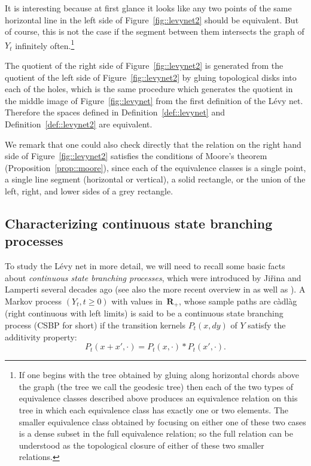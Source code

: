 \documentclass[JEP,XML,SOM,Unicode]{cedram}
\theoremstyle{plain}
\numberwithin{theorem}{section}
\theoremstyle{definition}
\newcommand{\R}{\mathbf{R}}
\newcommand{\cadlag}{càdlàg}
\begin{document}
\smallskip
It is interesting because at first glance it looks like any two points of the same horizontal line in the left side of Figure~\ref{fig::levynet2} should be equivalent. But of course, this is not the case if the segment between them intersects the graph of $Y_t$ infinitely often.\footnote{If one begins with the tree obtained by gluing along horizontal chords above the graph (the tree we call the geodesic tree) then each of the two types of equivalence classes described above produces an equivalence relation on this tree in which each equivalence class has exactly one or two elements. The smaller equivalence class obtained by focusing on either one of these two cases is a dense subset in the full equivalence relation; so the full relation can be understood as the topological closure of either of these two smaller relations.}

The quotient of the right side of Figure~\ref{fig::levynet2} is generated from the quotient of the left side of Figure~\ref{fig::levynet2} by gluing topological disks into each of the holes, which is the same procedure which generates the quotient in the middle image of Figure~\ref{fig::levynet} from the first definition of the Lévy net. Therefore the spaces defined in Definition~\ref{def::levynet} and Definition~\ref{def::levynet2} are equivalent.

We remark that one could also check directly that the relation on the right hand side of Figure~\ref{fig::levynet2} satisfies the conditions of Moore's theorem (Proposition~\ref{prop::moore}), since each of the equivalence classes is a single point, a single line segment (horizontal or vertical), a solid rectangle, or the union of the left, right, and lower sides of a grey rectangle.

\subsection{Characterizing continuous state branching processes}
\label{subsec::csbp}

To study the Lévy net in more detail, we will need to recall some basic facts about \emph{continuous state branching processes}, which were introduced by Ji\v{r}ina and Lamperti several decades ago \cite{miloslav, lamperticsbp, lampertibranchingaslimit} (see also the more recent overview in \cite{legallspatialbranchingbook} as well as \cite[Chap.\,10]{kyp2006levy_fluctuations}).
A Markov process $(Y_t, t \geq 0)$ with values in~$\R_+$, whose sample paths are {\cadlag} (right continuous with left limits) is said to be a continuous state branching process (CSBP for short) if the transition kernels $P_t(x,dy)$ of $Y$ satisfy the additivity property:
\begin{equation}
\label{eqn::CSBPproperty}
P_t(x+x', \cdot) = P_t(x, \cdot) * P_t(x',\cdot).
\end{equation}
\end{document}
